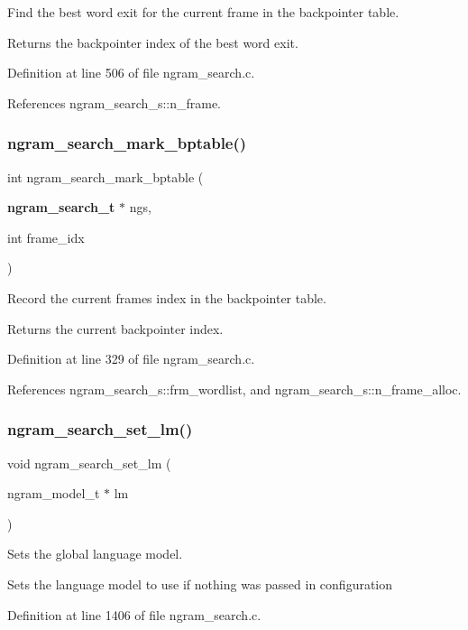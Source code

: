 Find the best word exit for the current frame in the backpointer table. 

\begin{DoxyReturn}{Returns}
the backpointer index of the best word exit. 
\end{DoxyReturn}


Definition at line 506 of file ngram\+\_\+search.\+c.



References ngram\+\_\+search\+\_\+s\+::n\+\_\+frame.

\mbox{\label{ngram__search_8c_a7772e007b7d7fdf437c87aeb08b59c71}} 
\subsubsection{ngram\+\_\+search\+\_\+mark\+\_\+bptable()}
{\footnotesize\ttfamily int ngram\+\_\+search\+\_\+mark\+\_\+bptable (\begin{DoxyParamCaption}\item[{\textbf{ ngram\+\_\+search\+\_\+t} $\ast$}]{ngs,  }\item[{int}]{frame\+\_\+idx }\end{DoxyParamCaption})}



Record the current frame\textquotesingle{}s index in the backpointer table. 

\begin{DoxyReturn}{Returns}
the current backpointer index. 
\end{DoxyReturn}


Definition at line 329 of file ngram\+\_\+search.\+c.



References ngram\+\_\+search\+\_\+s\+::frm\+\_\+wordlist, and ngram\+\_\+search\+\_\+s\+::n\+\_\+frame\+\_\+alloc.

\mbox{\label{ngram__search_8c_a0e681022d3fa0e63da066aad123245e7}} 
\subsubsection{ngram\+\_\+search\+\_\+set\+\_\+lm()}
{\footnotesize\ttfamily void ngram\+\_\+search\+\_\+set\+\_\+lm (\begin{DoxyParamCaption}\item[{ngram\+\_\+model\+\_\+t $\ast$}]{lm }\end{DoxyParamCaption})}



Sets the global language model. 

Sets the language model to use if nothing was passed in configuration 

Definition at line 1406 of file ngram\+\_\+search.\+c.

